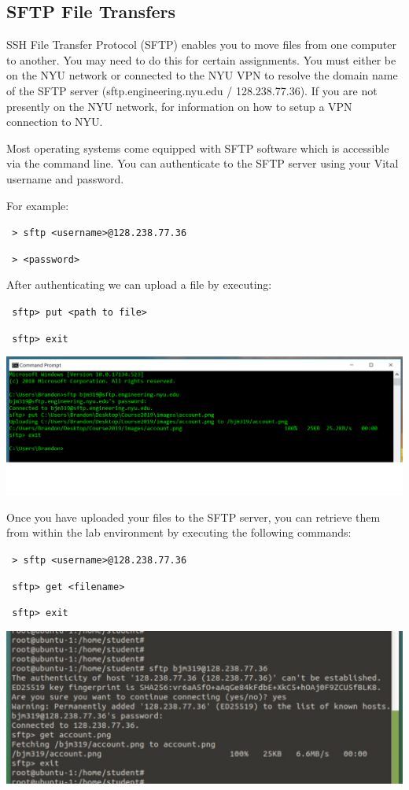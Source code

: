 \documentclass[12pt]{article}
\newcommand{\MYhref}[3][blue]{\href{#2}{\color{#1}{#3}}}%
\begin{document}
\subsection*{SFTP File Transfers}
SSH File Transfer Protocol (SFTP) enables you to move files from one computer to another. You may need to do this for certain assignments. You must either be on the NYU network or connected to the NYU VPN to resolve the domain name of the SFTP server (sftp.engineering.nyu.edu / 128.238.77.36). If you are not presently on the NYU network, \MYhref{https://www.nyu.edu/life/information-technology/getting-started/network-and-connectivity/vpn.html}{click here} for information on how to setup a VPN connection to NYU.

Most operating systems come equipped with SFTP software which is accessible via the command line. You can authenticate to the SFTP server using your Vital username and password.

For example:
\begin{adjustwidth}{2.5em}{0pt}
\texttt{
> sftp <username>@128.238.77.36
}

\texttt{
> <password>
}
\end{adjustwidth}


After authenticating we can upload a file by executing:
\begin{adjustwidth}{2.5em}{0pt}
\texttt{
sftp> put <path to file>
}

\texttt{
sftp> exit
}
\end{adjustwidth}
{%
\centering
\includegraphics[width=\linewidth]{sftp1.png}

}


Once you have uploaded your files to the SFTP server, you can retrieve them from within the lab environment by executing the following commands:
\begin{adjustwidth}{2.5em}{0pt}
\texttt{
> sftp <username>@128.238.77.36
}

\texttt{
sftp> get <filename>
}

\texttt{
sftp> exit
}
\end{adjustwidth}
{%
\centering
\includegraphics[width=\linewidth]{sftp2.png}

}
\end{document}
